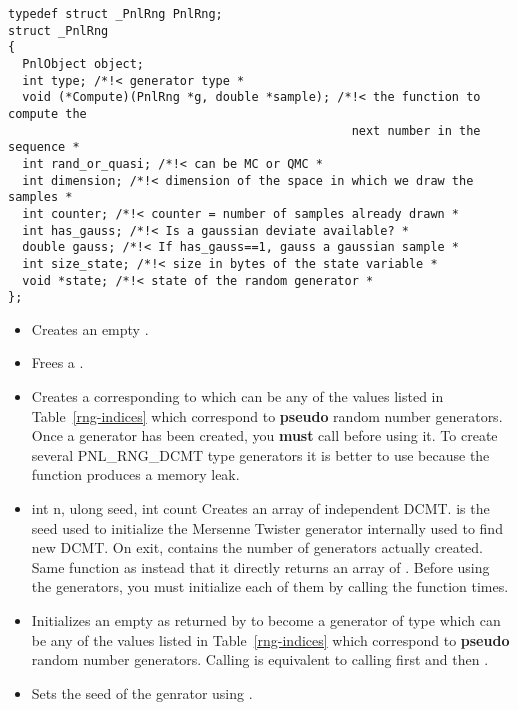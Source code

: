 \begin{verbatim}
typedef struct _PnlRng PnlRng;
struct _PnlRng
{
  PnlObject object;
  int type; /*!< generator type *
  void (*Compute)(PnlRng *g, double *sample); /*!< the function to compute the
                                                next number in the sequence *
  int rand_or_quasi; /*!< can be MC or QMC *
  int dimension; /*!< dimension of the space in which we draw the samples *
  int counter; /*!< counter = number of samples already drawn *
  int has_gauss; /*!< Is a gaussian deviate available? *
  double gauss; /*!< If has_gauss==1, gauss a gaussian sample *
  int size_state; /*!< size in bytes of the state variable *
  void *state; /*!< state of the random generator *
};
\end{verbatim}


\begin{itemize}
\item {}
  \sshortdescribe Creates an empty \ptr.
\item {}
  \sshortdescribe Frees a .
\item {}
  \sshortdescribe Creates a  corresponding to 
  which can be any of the values  listed in
  Table~\ref{rng-indices} which correspond to {\bf pseudo} random number generators.
  Once a generator has been created, you {\bf must} call
   before using it. To create several PNL_RNG_DCMT type
  generators it is better to use  because the
  function  produces a memory leak.
\item {}
  {int n, ulong seed, int \ptr count}
  \sshortdescribe Creates an array of  independent DCMT.  is
  the seed used to initialize the Mersenne Twister generator internally used to
  find new DCMT. On exit,  contains the number of generators actually
  created. Same function as  instead that it
  directly returns an array of . Before using the generators, you
  must initialize each of them by calling the function 
   times.
\item {}
  \sshortdescribe Initializes an empty  as returned by
   to become a generator of type  which can be
  any of the values  listed in Table~\ref{rng-indices} which
  correspond to {\bf pseudo} random number generators.
  Calling  is equivalent to calling first
   and then . 
\item {}
  \sshortdescribe Sets the seed of the genrator  using .
\end{itemize}


